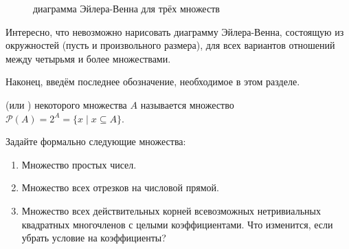\begin{figure}[ht!]
    \center
    \caption{диаграмма Эйлера-Венна для трёх множеств}
\end{figure}

\FloatBarrier

\begin{remark}
    Интересно, что невозможно нарисовать диаграмму Эйлера-Венна, состоящую из окружностей (пусть и произвольного размера), для всех вариантов отношений между четырьмя и более множествами.
\end{remark}

Наконец, введём последнее обозначение, необходимое в этом разделе.
\begin{definition}
     (или ) некоторого множества $ A $ называется множество $ \mathcal{P}(A) = 2^A = \{ x \mid x \subseteq A \} $.
\end{definition}


\begin{Exercise}[counter=SecExercise]
    \noindent
    Задайте формально следующие множества:
    \begin{enumerate}[label=\arabic*)]
        \item Множество простых чисел.
        \item Множество всех отрезков на числовой прямой.
        \item Множество всех действительных корней всевозможных нетривиальных квадратных многочленов с целыми коэффициентами.
              Что изменится, если убрать условие на коэффициенты?
    \end{enumerate}
\end{Exercise}

